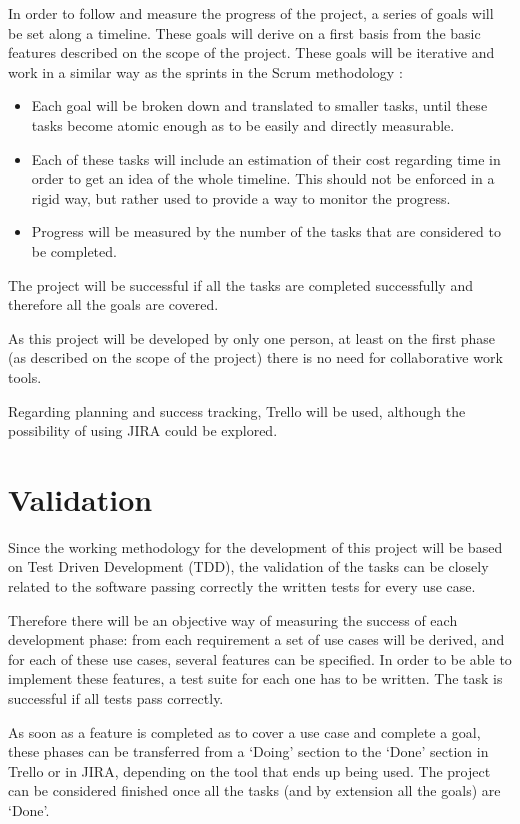 In order to follow and measure the progress of the project, a series of goals will be set along a timeline. These goals will derive on a first basis from the basic features described on the scope of the project. These goals will be iterative and work in a similar way as the sprints in the Scrum methodology \cite{9}:

\begin{itemize}
\item Each goal will be broken down and translated to smaller tasks, until these tasks become atomic enough as to be easily and directly measurable.

\item Each of these tasks will include an estimation of their cost regarding time in order to get an idea of the whole timeline. This should not be enforced in a rigid way, but rather used to provide a way to monitor the progress. 

\item Progress will be measured by the number of the tasks that are considered to be completed. 
\end{itemize}

The project will be successful if all the tasks are completed successfully and therefore all the goals are covered.

As this project will be developed by only one person, at least on the first phase (as described on the scope of the project) there is no need for collaborative work tools.

Regarding planning and success tracking, Trello will be used, although the possibility of using JIRA could be explored.

\section{Validation}
Since the working methodology for the development of this project will be based on Test Driven Development (TDD), the validation of the tasks can be closely related to the software passing correctly the written tests for every use case. 

Therefore there will be an objective way of measuring the success of each development phase: from each requirement a set of use cases will be derived, and for each of these use cases, several features can be specified. In order to be able to implement these features, a test suite for each one has to be written. The task is successful if all tests pass correctly.

As soon as a feature is completed as to cover a use case and complete a goal, these phases can be transferred from a ‘Doing’ section to the ‘Done’ section in Trello or in JIRA, depending on the tool that ends up being used. The project can be considered finished once all the tasks (and by extension all the goals) are ‘Done’.